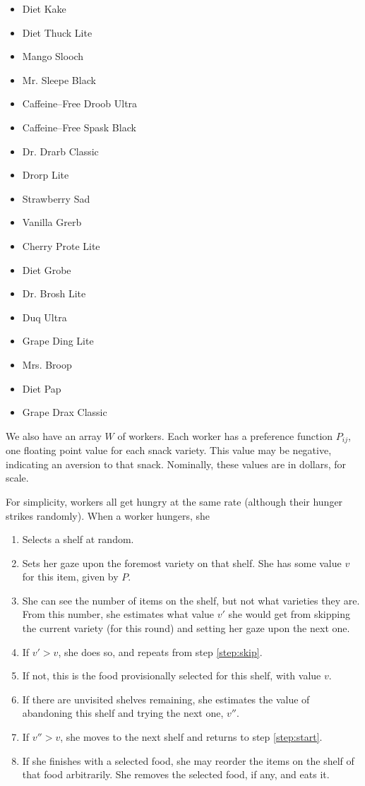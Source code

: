 \documentclass[twocolumn]{article}
\begin{document}
\begin{itemize}
\item Diet Kake 
\item Diet Thuck Lite
\item Mango Slooch 
\item Mr. Sleepe Black
\item Caffeine--Free Droob Ultra
\item Caffeine--Free Spask Black
\item Dr. Drarb Classic
\item Drorp Lite
\item Strawberry Sad 
\item Vanilla Grerb
\item Cherry Prote Lite
\item Diet Grobe
\item Dr. Brosh Lite
\item Duq Ultra
\item Grape Ding Lite
\item Mrs. Broop 
\item Diet Pap 
\item Grape Drax Classic
\end{itemize}

We also have an array $W$ of workers. Each worker has a preference function $P_{ij}$, one floating point value for each snack variety. This value may be negative, indicating an aversion to that snack. Nominally, these values are in dollars, for scale.

For simplicity, workers all get hungry at the same rate (although their hunger strikes randomly). When a worker hungers, she

\begin{enumerate}
\item Selects a shelf at random.
\item Sets her gaze upon the foremost variety on that shelf. She has some value $v$ for this item, given by $P$. \label{step:start}
\item She can see the number of items on the shelf, but not what varieties they are. From this number, she estimates what value $v'$ she would get from skipping the current variety (for this round) and setting her gaze upon the next one. \label{step:skip}
\item If $v' > v$, she does so, and repeats from step \ref{step:skip}.
\item If not, this is the food provisionally selected for this shelf, with value $v$.
\item If there are unvisited shelves remaining, she estimates the value of abandoning this shelf and trying the next one, $v''$.
\item If $v'' > v$, she moves to the next shelf and returns to step \ref{step:start}.
\item If she finishes with a selected food, she may reorder the items on the shelf of that food arbitrarily. She removes the selected food, if any, and eats it.
\end{enumerate}
\end{document}
